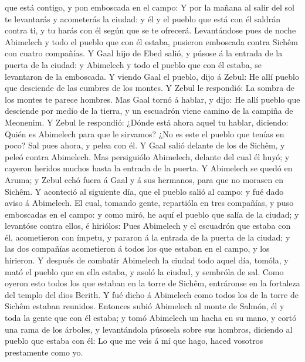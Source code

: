 que está contigo, y pon emboscada en el campo:  Y por la
mañana al salir del sol te levantarás y acometerás la ciudad: y él y el
pueblo que está con él saldrán contra ti, y tu harás con él según que se
te ofrecerá.  Levantándose pues de noche Abimelech y todo
el pueblo que con él estaba, pusieron emboscada contra Sichêm con cuatro
compañías.  Y Gaal hijo de Ebed salió, y púsose á la
entrada de la puerta de la ciudad: y Abimelech y todo el pueblo que con
él estaba, se levantaron de la emboscada.  Y viendo Gaal
el pueblo, dijo á Zebul: He allí pueblo que desciende de las cumbres de
los montes. Y Zebul le respondió: La sombra de los montes te parece
hombres.  Mas Gaal tornó á hablar, y dijo: He allí pueblo
que desciende por medio de la tierra, y un escuadrón viene camino de la
campiña de Meonenim.  Y Zebul le respondió: ¿Dónde está
ahora aquel tu hablar, diciendo: Quién es Abimelech para que le
sirvamos? ¿No es este el pueblo que tenías en poco? Sal pues ahora, y
pelea con él.  Y Gaal salió delante de los de Sichêm, y
peleó contra Abimelech.  Mas persiguiólo Abimelech,
delante del cual él huyó; y cayeron heridos muchos hasta la entrada de
la puerta.  Y Abimelech se quedó en Aruma; y Zebul echó
fuera á Gaal y á sus hermanos, para que no morasen en Sichêm.
 Y aconteció al siguiente día, que el pueblo salió al
campo: y fué dado aviso á Abimelech.  El cual, tomando
gente, repartióla en tres compañías, y puso emboscadas en el campo: y
como miró, he aquí el pueblo que salía de la ciudad; y levantóse contra
ellos, é hiriólos:  Pues Abimelech y el escuadrón que
estaba con él, acometieron con ímpetu, y pararon á la entrada de la
puerta de la ciudad; y las dos compañías acometieron á todos los que
estaban en el campo, y los hirieron.  Y después de
combatir Abimelech la ciudad todo aquel día, tomóla, y mató el pueblo
que en ella estaba, y asoló la ciudad, y sembróla de sal.
 Como oyeron esto todos los que estaban en la torre de
Sichêm, entráronse en la fortaleza del templo del dios Berith.
 Y fué dicho á Abimelech como todos los de la torre de
Sichêm estaban reunidos.  Entonces subió Abimelech al
monte de Salmón, él y toda la gente que con él estaba; y tomó Abimelech
un hacha en su mano, y cortó una rama de los árboles, y levantándola
púsosela sobre sus hombros, diciendo al pueblo que estaba con él: Lo que
me veis á mí que hago, haced vosotros prestamente como yo.
